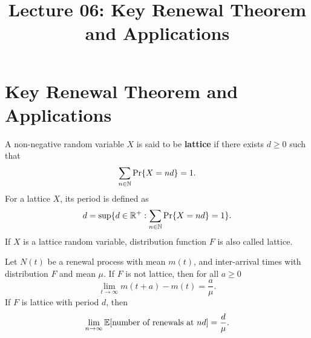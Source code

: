 \documentclass[a4paper,10pt,english]{article}
\title{Lecture 06: Key Renewal Theorem and Applications}
\author{}
\begin{document}
\maketitle
\section{Key Renewal Theorem and Applications}
\begin{defn} A non-negative random variable $X$ is said to be \textbf{lattice} if there exists $d \geq 0$ such that 
\begin{equation*}
\sum_{n\in\mathbb{N}}\Pr\{X = nd\} = 1.
\end{equation*}
For a lattice $X$, its period is defined as 
\begin{equation*}
d = \sup\{ d \in\mathbb{R}^+: \sum_{n\in\mathbb{N}}\Pr\{X = nd\} = 1 \}.
\end{equation*}
If $X$ is a lattice random variable, distribution function $F$ is also called lattice.
\end{defn}
\begin{thm} Let $N(t)$ be a renewal process with mean $m(t)$, and inter-arrival times with distribution $F$ and mean $\mu$. If $F$ is not lattice, then for all $a \geq 0$
\begin{equation*}
\lim_{t \to \infty} m(t+a) -m(t) = \frac{a}{\mu}.
\end{equation*}
If $F$ is lattice with period $d$, then 
\begin{equation*}
\lim_{n \to \infty} \mathbb{E}[\text{number of renewals at } nd] = \frac{d}{\mu}.
\end{equation*}
\end{thm}
\end{document}
